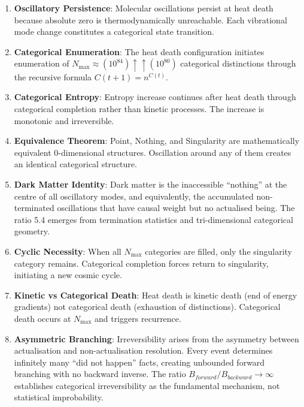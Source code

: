 \documentclass[12pt,a4paper]{article}
\theoremstyle{definition}
\theoremstyle{remark}
\newcommand{\Nmax}{N_{\text{max}}}
\begin{document}
\begin{enumerate}
    \item \textbf{Oscillatory Persistence}: Molecular oscillations persist at heat death because absolute zero is thermodynamically unreachable. Each vibrational mode change constitutes a categorical state transition.

    \item \textbf{Categorical Enumeration}: The heat death configuration initiates enumeration of $\Nmax \approx (10^{84}) \uparrow\uparrow (10^{80})$ categorical distinctions through the recursive formula $C(t+1) = n^{C(t)}$.

    \item \textbf{Categorical Entropy}: Entropy increase continues after heat death through categorical completion rather than kinetic processes. The increase is monotonic and irreversible.

    \item \textbf{Equivalence Theorem}: Point, Nothing, and Singularity are mathematically equivalent 0-dimensional structures. Oscillation around any of them creates an identical categorical structure.

    \item \textbf{Dark Matter Identity}: Dark matter is the inaccessible ``nothing'' at the centre of all oscillatory modes, and equivalently, the accumulated non-terminated oscillations that have causal weight but no actualised being. The ratio 5.4 emerges from termination statistics and tri-dimensional categorical geometry.

    \item \textbf{Cyclic Necessity}: When all $\Nmax$ categories are filled, only the singularity category remains. Categorical completion forces return to singularity, initiating a new cosmic cycle.

    \item \textbf{Kinetic vs Categorical Death}: Heat death is kinetic death (end of energy gradients) not categorical death (exhaustion of distinctions). Categorical death occurs at $\Nmax$ and triggers recurrence.

    \item \textbf{Asymmetric Branching}: Irreversibility arises from the asymmetry between actualisation and non-actualisation resolution. Every event determines infinitely many ``did not happen'' facts, creating unbounded forward branching with no backward inverse. The ratio $B_{forward}/B_{backward} \to \infty$ establishes categorical irreversibility as the fundamental mechanism, not statistical improbability.


\end{enumerate}
\end{document}
